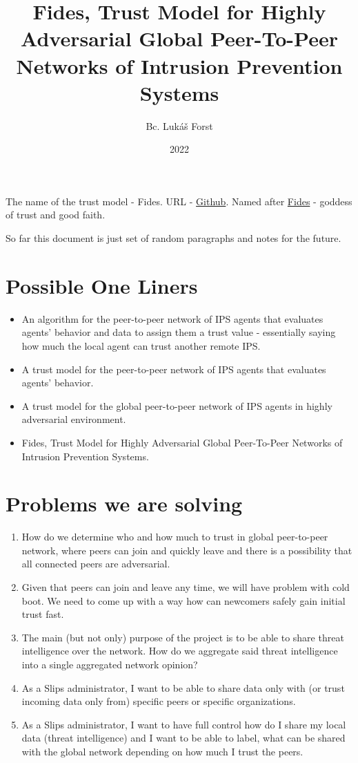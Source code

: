\documentclass{article}
\title{Fides, Trust Model for Highly Adversarial Global Peer-To-Peer Networks of Intrusion Prevention Systems}
\author{Bc. Lukáš Forst}
\date{2022}
\begin{document}
\maketitle

The name of the trust model - Fides. URL - \href{https://github.com/LukasForst/fides}{Github}.
Named after \href{https://en.wikipedia.org/wiki/Fides_(deity)}{Fides} - goddess of trust and good faith.

So far this document is just set of random paragraphs and notes for the future.

\section{Possible One Liners}
\begin{itemize}
\item An algorithm for the peer-to-peer network of IPS agents that evaluates agents’ behavior and data to assign them a trust value - essentially saying how much the local agent can trust another remote IPS.
\item A trust model for the peer-to-peer network of IPS agents that evaluates agents’ behavior.
\item A trust model for the global peer-to-peer network of IPS agents in highly adversarial environment.
\item Fides, Trust Model for Highly Adversarial Global Peer-To-Peer Networks of Intrusion Prevention Systems.
\end{itemize}

\section{Problems we are solving}
\begin{enumerate}
\item How do we determine who and how much to trust in global peer-to-peer network, where peers can join and quickly leave and there is a possibility that all connected peers are adversarial.
\item Given that peers can join and leave any time, we will have problem with cold boot. We need to come up with a way how can newcomers safely gain initial trust fast.
\item The main (but not only) purpose of the project is to be able to share threat intelligence over the network. How do we aggregate said threat intelligence into a single aggregated network opinion?
\item As a Slips administrator, I want to be able to share data only with (or trust incoming data only from) specific peers or specific organizations.
\item As a Slips administrator, I want to have full control how do I share my local data (threat intelligence) and I want to be able to label, what can be shared with the global network depending on how much I trust the peers.
\end{enumerate}













\medskip

\printbibliography
\end{document}
